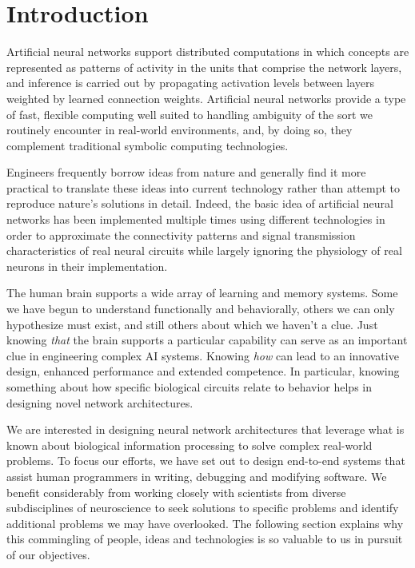 \documentclass[letterpaper,11pt]{article}
\begin{document}

\section{Introduction}


Artificial neural networks support distributed computations in which concepts are represented as patterns of activity in the units that comprise the network layers, and inference is carried out by propagating activation levels between layers weighted by learned connection weights.  Artificial neural networks provide a type of fast, flexible computing well suited to handling ambiguity of the sort we routinely encounter in real-world environments, and, by doing so, they complement traditional symbolic computing technologies.

Engineers frequently borrow ideas from nature and generally find it more practical to translate these ideas into current technology rather than attempt to reproduce nature's solutions in detail. Indeed, the basic idea of artificial neural networks has been implemented multiple times using different technologies in order to approximate the connectivity patterns and signal transmission characteristics of real neural circuits while largely ignoring the physiology of real neurons in their implementation. 

The human brain supports a wide array of learning and memory systems. Some we have begun to understand functionally and behaviorally, others we can only hypothesize must exist, and still others about which we haven't a clue. Just knowing {\it{that}} the brain supports a particular capability can serve as an important clue in engineering complex AI systems. Knowing {\it{how}} can lead to an innovative design, enhanced performance and extended competence. In particular, knowing something about how specific biological circuits relate to behavior helps in designing novel network architectures.

We are interested in designing neural network architectures that leverage what is known about biological information processing to solve complex real-world problems. To focus our efforts, we have set out to design end-to-end systems that assist human programmers in writing, debugging and modifying software. We benefit considerably from working closely with scientists from diverse subdisciplines of neuroscience to seek solutions to specific problems and identify additional problems we may have overlooked. The following section explains why this commingling of people, ideas and technologies is so valuable to us in pursuit of our objectives.
\end{document}
